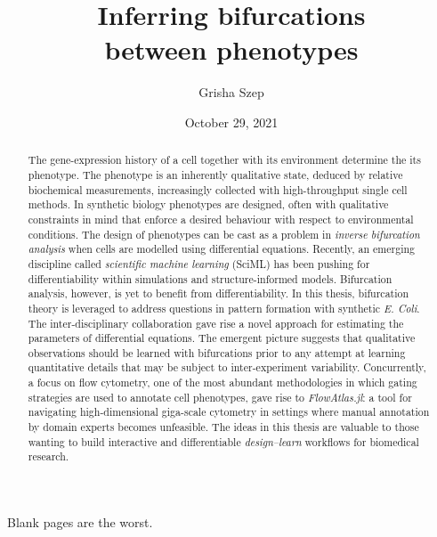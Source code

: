 \title{Inferring bifurcations\\between phenotypes}
\author{Grisha Szep}


\date{October 29, 2021}
\maketitle

\begin{abstract} %
\vspace{-3em}
    
    The gene-expression history of a cell together with its environment determine the its phenotype. The phenotype is an inherently qualitative state, deduced by relative biochemical measurements, increasingly collected with high-throughput single cell methods. In synthetic biology phenotypes are designed, often with qualitative constraints in mind that enforce a desired behaviour with respect to environmental conditions. The design of phenotypes can be cast as a problem in \emph{inverse bifurcation analysis} when cells are modelled using differential equations. Recently, an emerging discipline called \emph{scientific machine learning} (SciML) has been pushing for differentiability within simulations and structure-informed models. Bifurcation analysis, however, is yet to benefit from differentiability. In this thesis, bifurcation theory is leveraged to address questions in pattern formation with synthetic \emph{E. Coli}. The inter-disciplinary collaboration gave rise a novel approach for estimating the parameters of differential equations. The emergent picture suggests that qualitative observations should be learned with bifurcations prior to any attempt at learning quantitative details that may be subject to inter-experiment variability. Concurrently, a focus on flow cytometry, one of the most abundant methodologies in which gating strategies are used to annotate cell phenotypes, gave rise to \emph{FlowAtlas.jl}: a tool for navigating high-dimensional giga-scale cytometry in settings where manual annotation by domain experts becomes unfeasible. The ideas in this thesis are valuable to those wanting to build interactive and differentiable \emph{design--learn} workflows for biomedical research.

\end{abstract}
\newpage
\clearpage
\thispagestyle{empty}
\noindent Blank pages are the worst.\\
